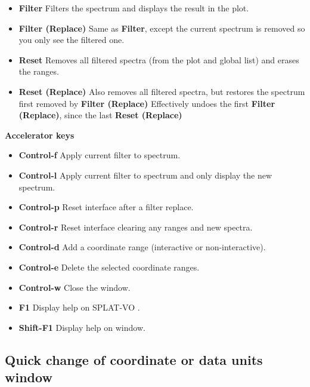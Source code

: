 \documentclass[twoside,11pt,nolof]{starlink}
\providecommand{\SPLAT}{\textsf{SPLAT-VO }}
\newcommand{\labelitem}[1]{\textbf{#1}}
\providecommand{\subheading}[1]{\textbf{\large{#1}}}
\begin{document}
\begin{itemize}

\item \labelitem{Filter} Filters the spectrum and displays the result in the
plot.

\item \labelitem{Filter (Replace)} Same as \labelitem{Filter}, except the
current spectrum is removed so you only see the filtered one.

\item \labelitem{Reset} Removes all filtered spectra (from the plot and global
list) and erases the ranges.

\item \labelitem{Reset (Replace)} Also removes all filtered spectra, but
restores the spectrum first removed by \labelitem{Filter (Replace)}
Effectively undoes the first \labelitem{Filter (Replace)}, since the last
\labelitem{Reset (Replace)}

\end{itemize}

\subheading{Accelerator keys}

\begin{itemize}
\item \labelitem{Control-f} Apply current filter to spectrum.
\item \labelitem{Control-l} Apply current filter to spectrum and only display the new spectrum.
\item \labelitem{Control-p} Reset interface after a filter replace.
\item \labelitem{Control-r} Reset interface clearing any ranges and new spectra.

\item \labelitem{Control-d} Add a coordinate range (interactive or non-interactive).
\item \labelitem{Control-e} Delete the selected coordinate ranges.

\item \labelitem{Control-w} Close the window.
\item \labelitem{F1} Display help on \SPLAT.
\item \labelitem{Shift-F1} Display help on window.
\end{itemize}


\newpage
\subsection{Quick change of coordinate or data units window}
\end{document}
